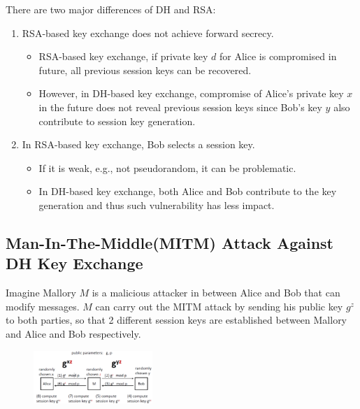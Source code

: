 \documentclass[12pt]{article}
\theoremstyle{definition}
\begin{document}
There are two major differences of DH and RSA:
\begin{enumerate}
  \item RSA-based key exchange does not achieve forward secrecy. 
  \begin{itemize}
    \item RSA-based key exchange, if private key $d$ for Alice is compromised in future, all previous session keys can be recovered.
    \item However, in DH-based key exchange, compromise of Alice's private key $x$ in the future does not reveal previous session keys since Bob's key $y$ also contribute to session key generation.
  \end{itemize}
  \item In RSA-based key exchange, Bob selects a session key.
  \begin{itemize}
    \item If it is weak, e.g., not pseudorandom, it can be problematic.
    \item In DH-based key exchange, both Alice and Bob contribute to the key generation and thus such vulnerability has less impact.
  \end{itemize}
\end{enumerate}
\subsection{Man-In-The-Middle(MITM) Attack Against DH Key Exchange}
Imagine Mallory $M$ is a malicious attacker in between Alice and Bob that can modify messages. $M$ can carry out the MITM attack by sending his public key $g^z$ to both parties, so that 2 different session keys are established between Mallory and Alice and Bob respectively.
\begin{figure}[h]
\centering
\includegraphics[width=0.4\textwidth]{8.png}
\end{figure}
\end{document}
